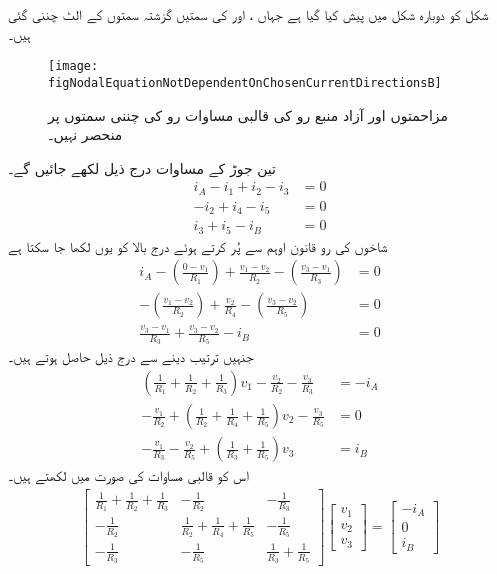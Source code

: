 شکل  کو دوبارہ شکل  میں پیش کیا گیا ہے جہاں ،  اور  کی سمتیں گزشتہ سمتوں کے الٹ چننی گئی ہیں۔
\begin{figure}
\centering
\texttt{[image: figNodalEquationNotDependentOnChosenCurrentDirectionsB]}
\caption{مزاحمتوں اور آزاد منبع رو کی قالبی مساوات رو کی چننی سمتوں پر منحصر نہیں۔}
\label{شکل_جوڑ_چار_جوڑ_تین_آزاد_مساوات_ب}
\end{figure}
تین جوڑ کے مساوات درج ذیل لکھے جائیں گے۔
\begin{align*}
i_A-i_1+i_2-i_3&=0\\
-i_2+i_4-i_5&=0\\
i_3+i_5-i_B&=0
\end{align*}
شاخوں کی رو قانون اوہم سے پُر کرتے ہوئے درج بالا کو یوں لکھا جا سکتا ہے
\begin{align*}
i_A-\left(\frac{0-v_1}{R_1}\right)+\frac{v_1-v_2}{R_2}-\left(\frac{v_3-v_1}{R_3}\right)&=0\\
-\left(\frac{v_1-v_2}{R_2}\right)+\frac{v_2}{R_4}-\left(\frac{v_3-v_2}{R_5}\right)&=0\\
\frac{v_3-v_1}{R_3}+\frac{v_3-v_2}{R_5}-i_B&=0
\end{align*}
جنہیں ترتیب دینے سے درج ذیل حاصل ہوتے ہیں۔
\begin{align}
\left(\frac{1}{R_1}+\frac{1}{R_2}+\frac{1}{R_3}\right) v_1-\frac{v_2}{R_2}-\frac{v_3}{R_3}&=-i_A \label{مساوات_جوڑ_پہلا_جوڑ}\\
-\frac{v_1}{R_2}+\left(\frac{1}{R_2}+\frac{1}{R_4}+\frac{1}{R_5}\right)v_2-\frac{v_3}{R_5}&=0 \label{مساوات_جوڑ_دوسرا_جوڑ}\\
-\frac{v_1}{R_3}-\frac{v_2}{R_5}+\left(\frac{1}{R_3}+\frac{1}{R_5}\right)v_3&=i_B \label{مساوات_جوڑ_تیسرا_جوڑ}
\end{align}
اس کو قالبی مساوات کی صورت میں لکھتے ہیں۔
\begin{align}\label{مساوات_جوڑ_آزاد_مساوات_دو_جوڑ_پ}
\begin{bmatrix}
\frac{1}{R_1}+\frac{1}{R_2}+\frac{1}{R_3} & -\frac{1}{R_2} &- \frac{1}{R_3}\\[6pt]
-\frac{1}{R_2}&\frac{1}{R_2}+\frac{1}{R_4}+\frac{1}{R_5}& -\frac{1}{R_5}\\[6pt]
-\frac{1}{R_3} & -\frac{1}{R_5}&\frac{1}{R_3}+\frac{1}{R_5}
\end{bmatrix}
\begin{bmatrix}
v_1\\[6pt]
v_2\\[6pt]
v_3
\end{bmatrix}
=
\begin{bmatrix}
-i_A\\[6pt]
0\\[6pt]
i_B
\end{bmatrix}
\end{align}

